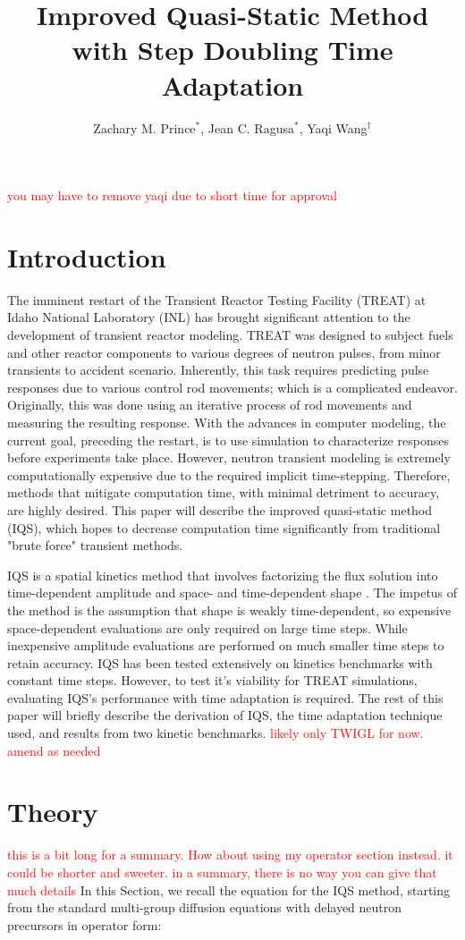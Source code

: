 \documentclass{anstrans}
\title{Improved Quasi-Static Method with Step Doubling Time Adaptation}
\author{Zachary M. Prince$^{*}$, Jean C. Ragusa$^{*}$, Yaqi Wang$^{\dagger}$}
\institute{
$^{*}$Department of Nuclear Engineering, Texas A\&M University, College Station, TX
\and
$^{\dagger}$Idaho National Laboratory, Idaho Falls, ID
}
\newcommand{\tcr}[1]{\textcolor{red}{#1}}
\begin{document}

\tcr{you may have to remove yaqi due to short time for approval}

\section{Introduction}
The imminent restart of the Transient Reactor Testing Facility (TREAT) at Idaho National Laboratory (INL) has brought significant attention to the development of transient reactor modeling.  TREAT was designed to subject fuels and other reactor components to various degrees of neutron pulses, from minor transients to accident scenario.  Inherently, this task requires predicting pulse responses due to various control rod movements; which is a complicated endeavor.  Originally, this was done using an iterative process of rod movements and measuring the resulting response.  With the advances in computer modeling, the current goal, preceding the restart, is to use simulation to characterize responses before experiments take place.  However, neutron transient modeling is extremely computationally expensive due to the required implicit time-stepping.  Therefore, methods that mitigate computation time, with minimal detriment to accuracy, are highly desired.  This paper will describe the improved quasi-static method (IQS), which hopes to decrease computation time significantly from traditional "brute force" transient methods.

IQS is a spatial kinetics method that involves factorizing the flux solution into time-dependent amplitude and space- and time-dependent shape \cite{Ott_1966,Dulla2008}.  The impetus of the method is the assumption that shape is weakly time-dependent, so expensive space-dependent evaluations are only required on large time steps.  While inexpensive amplitude evaluations are performed on much smaller time steps to retain accuracy.  IQS has been tested extensively on kinetics benchmarks with constant time steps.  However, to test it's viability for TREAT simulations, evaluating IQS's performance with time adaptation is required.  The rest of this paper will briefly describe the derivation of IQS, the time adaptation technique used, and results from two kinetic benchmarks.
\tcr{likely only TWIGL for now. amend as needed}

\section{Theory}
\tcr{this is a bit long for a summary. How about using my operator section instead. it could be shorter and sweeter. in a summary, there is no way you can give that much details}
In this Section, we recall the equation for the IQS method, starting from the standard multi-group diffusion equations with delayed neutron precursors in operator form:
\end{document}
